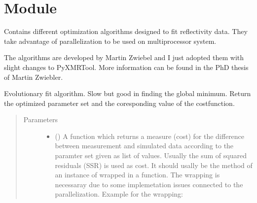 \documentclass[letterpaper,10pt,english]{sphinxmanual}
\begin{document}
\section{Module }
\label{\detokenize{modules-api/fitters:module-Fitters}}\label{\detokenize{modules-api/fitters:module-fitters}}\label{\detokenize{modules-api/fitters::doc}}
Contains different optimization algorithms designed to fit reflectivity data.
They take advantage of parallelization to be used on multiprocessor system.

The algorithms are developed by Martin Zwiebel and I just adopted them with slight changes to PyXMRTool.
More information can be found in the PhD thesis of Martin Zwiebler.

\begin{fulllineitems}
\label{\detokenize{modules-api/fitters:Fitters.Evolution}}
Evolutionary fit algorithm. Slow but good in finding the global minimum.
Return the optimized parameter set and the coresponding value of the costfunction.
\begin{quote}\begin{description}
\item[{Parameters}] \leavevmode\begin{itemize}
\item {} 
 () \textendash{} 
A function which returns a measure (cost) for the difference between measurement and simulated data according to the paramter set given as list of values. Usually the sum of squared residuals (SSR) is used as cost. It should usally be the method  of an instance of  wrapped in a function. The wrapping is necessaray due to some implemetation issues connected to the parallelization.
Example for the wrapping:

%
\begin{sphinxVerbatim}[commandchars=\\\{\}]
  
 
     
\end{sphinxVerbatim}


\end{itemize}
\end{description}
\end{quote}
\end{fulllineitems}
\end{document}
